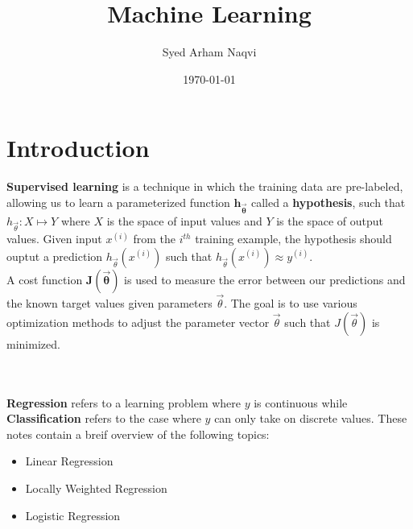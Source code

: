 \documentclass[11pt]{article}
\title{Machine Learning}
\author{Syed Arham Naqvi}
\date{\today}
\newcommand{\BF}{\textbf}
\newcommand{\BS}{\boldsymbol}
\newcommand{\MBF}{\mathbf}
\newcommand{\VTH}{\vec{\theta}}
\newcommand{\ithx}{x^{(i)}}
\begin{document}
\maketitle
\tableofcontents
\newpage

\section{Introduction}

\BF{Supervised learning} is a technique in which the training data are pre-labeled,
allowing us to learn a parameterized function $\mathbf{h_{\vec{\BS{\theta}}}}$ called a
\BF{hypothesis}, such that $h_{\VTH}:X\mapsto Y$ where $X$ is the space of input
values and $Y$ is the space of output values. Given input $\ithx$ from the $i^{th}$ training
example, the hypothesis should ouptut a prediction $h_{\VTH}(\ithx)$ such that
$h_{\VTH}(\ithx) \approx y^{(i)}$.\\

A cost function $\MBF{J(\VTH)}$ is used to measure the error between our predictions
and the known target values given parameters $\VTH$. The goal is to use various optimization methods
to adjust the parameter vector $\VTH$ such that $J(\VTH)$ is minimized.\\\\

\\

\BF{Regression} refers to a learning problem where $y$ is continuous while \BF{Classification}
refers to the case where $y$ can only take on discrete values. These notes contain a breif overview
of the following topics:
\begin{itemize}
    \item Linear Regression
    \item Locally Weighted Regression
    \item Logistic Regression
\end{itemize}
\end{document}
